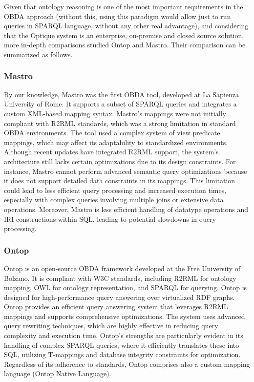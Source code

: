 Given that ontology reasoning is one of the most important requirements in the OBDA approach (without this, using this paradigm would allow just to run queries in SPARQL language, without any other real advantage), and considering that the Optique system is an enterprise, on-premise and closed source solution, more in-depth comparisons \cite{DBLP:conf/dlog/NamiciG18} studied Ontop and Mastro. Their comparison can be summarized as follows.

\subsubsection{Mastro}
By our knowledge, Mastro \cite{DBLP:journals/semweb/CalvaneseGLLPRRRS11} was the first OBDA tool, developed at La Sapienza University of Rome. It supports a subset of SPARQL queries and integrates a custom XML-based mapping syntax.
Mastro's mappings were not initially compliant with R2RML standards, which was a strong limitation in standard OBDA environments. The tool used a complex system of view predicate mappings, which may affect its adaptability to standardized environments. Although recent updates have integrated R2RML support, the system's architecture still lacks certain optimizations due to its design constraints. For instance, Mastro cannot perform advanced semantic query optimizations because it does not support detailed data constraints in its mappings. This limitation could lead to less efficient query processing and increased execution times, especially with complex queries involving multiple joins or extensive data operations.
Moreover, Mastro is less efficient handling of datatype operations and IRI constructions within SQL, leading to potential slowdowns in query processing.

\subsubsection{Ontop}
Ontop \cite{DBLP:conf/sebd/CalvaneseCKKKLR15} is an open-source OBDA framework developed at the Free University of Bolzano. It is compliant with W3C standards, including R2RML for ontology mapping, OWL for ontology representation, and SPARQL for querying. Ontop is designed for high-performance query answering over virtualized RDF graphs.
Ontop provides an efficient query answering system that leverages R2RML mappings and supports comprehensive optimizations. The system uses advanced query rewriting techniques, which are highly effective in reducing query complexity and execution time. Ontop's strengths are particularly evident in its handling of complex SPARQL queries, where it efficiently translates these into SQL, utilizing T-mappings and database integrity constraints for optimization.
Regardless of its adherence to standards, Ontop comprises also a custom mapping language (Ontop Native Language).


